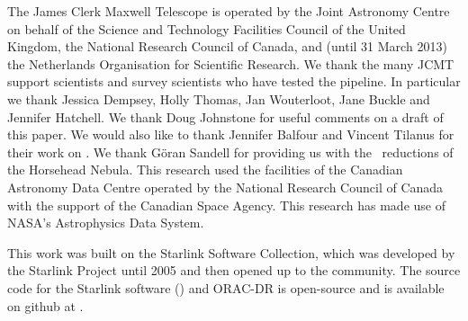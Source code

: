 \documentclass[final,authoryear,5p,times,twocolumn]{elsarticle}
\begin{document}
The James Clerk Maxwell Telescope is operated by the Joint Astronomy
Centre on behalf of the Science and Technology Facilities Council of
the United Kingdom, the National Research Council of Canada, and
(until 31 March 2013) the Netherlands Organisation for Scientific
Research. We thank the many JCMT support scientists and survey
scientists who have tested the pipeline. In particular we thank
Jessica Dempsey, Holly Thomas, Jan Wouterloot, Jane Buckle and
Jennifer Hatchell. We thank Doug Johnstone for useful comments on a
draft of this paper. We would also like to thank Jennifer Balfour and
Vincent Tilanus for their work on \gsdacsis. We thank
G\"{o}ran Sandell for providing us with the \specx\ reductions of the Horsehead
Nebula. This research used the facilities of the Canadian Astronomy
Data Centre operated by the National Research Council of Canada with
the support of the Canadian Space Agency. This research has made use
of NASA's Astrophysics Data System.

This work was built on the Starlink Software Collection, which was
developed by the Starlink Project until 2005
\citep{1982QJRAS..23..485D,2005ASPC..347...22D,2008ASPC..394..650C}
and then opened up to the community. The source code for the Starlink
software () and ORAC-DR is open-source and is
available on github at
.


\end{document}
